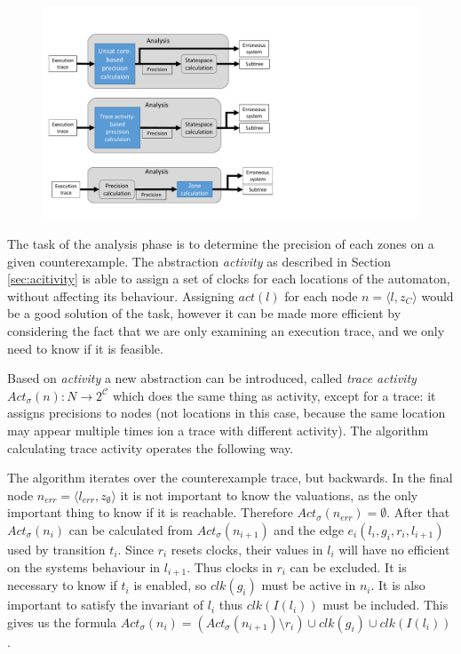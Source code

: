 \begin{runningExample}
\begin{figure}[h]
	\centering
	\includegraphics[width=\textwidth]{include/figures/modules_ssp_anal_act}
\end{figure}

The task of the analysis phase is to determine the precision of each zones on a given counterexample. The abstraction \emph{activity} as described in Section \ref{sec:acitivity} is able to assign a set of clocks for each locations of the automaton, without affecting its behaviour. Assigning $act(l)$ for each node $n=\langle l, z_{C} \rangle$ would be a good solution of the task, however it can be made more efficient by considering the fact that we are only examining an execution trace, and we only need to know if it is feasible.

Based on \emph{activity} a new abstraction can be introduced, called \emph{trace activity} $Act_\sigma(n): N \to 2^\mathcal{C}$ which does the same thing as activity, except for a trace: it assigns precisions to nodes (not locations in this case, because the same location may appear multiple times ion a trace with different activity). The algorithm calculating trace activity operates the following way.

The algorithm iterates over the counterexample trace, but backwards. In the final node  $n_{err}=\langle l_{err}, z_{\emptyset} \rangle$ it is not important to know the valuations, as the only important thing to know if it is reachable. Therefore $Act_\sigma(n_{err})=\emptyset$. After that $Act_\sigma(n_i)$ can be calculated from $Act_\sigma(n_{i+1})$ and the edge $e_i(l_i,g_i,r_i,l_{i+1})$ used by transition $t_i$. Since $r_i$ resets clocks, their values in $l_i$ will have no efficient on the systems behaviour in $l_{i+1}$. Thus clocks in $r_i$ can be excluded. It is necessary to know if $t_i$ is enabled, so $\textit{clk}(g_i)$ must be active in $n_i$. It is also important to satisfy the invariant of $l_i$ thus $\textit{clk}(I(l_i))$ must be included. This gives us the formula $Act_\sigma(n_i)=(Act_\sigma(n_{i+1}) \setminus r_i) \cup \textit{clk}(g_i) \cup \textit{clk}(I(l_i))$. 


\end{runningExample}
